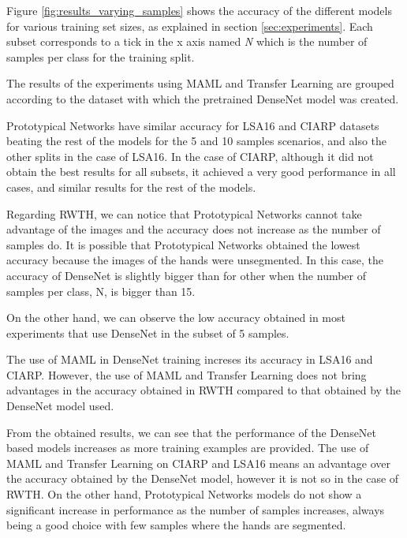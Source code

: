 Figure \ref{fig:results_varying_samples} shows the accuracy of the different models for various training set sizes, as explained in section \ref{sec:experiments}. Each subset corresponds to a tick in the x axis named \textit{N} which is the number of samples per class for the training split. 

The results of the experiments using MAML and Transfer Learning are grouped according to the dataset with which the pretrained DenseNet model was created.

Prototypical Networks have similar accuracy for LSA16 and CIARP datasets beating the rest of the models for the 5 and 10 samples scenarios, and also the other splits in the case of LSA16. In the case of CIARP, although it did not obtain the best results for all subsets, it achieved a very good performance in all cases, and similar results for the rest of the models.

Regarding RWTH, we can notice that Prototypical Networks cannot take advantage of the images and the accuracy does not increase as the number of samples do. It is possible that Prototypical Networks obtained the lowest accuracy because the images of the hands were unsegmented. In this case, the accuracy of DenseNet is slightly bigger than for other when the number of samples per class, N, is bigger than 15.

On the other hand, we can observe the low accuracy obtained in most experiments that use DenseNet in the subset of 5 samples.

The use of MAML in DenseNet training increses its accuracy in LSA16 and CIARP. However, the use of MAML and Transfer Learning does not bring advantages in the accuracy obtained in RWTH compared to that obtained by the DenseNet model used.

From the obtained results, we can see that the performance of the DenseNet based models increases as more training examples are provided. The use of MAML and Transfer Learning on CIARP and LSA16 means an advantage over the accuracy obtained by the DenseNet model, however it is not so in the case of RWTH. On the other hand, Prototypical Networks models do not show a significant increase in performance as the number of samples increases, always being a good choice with few samples where the hands are segmented.

